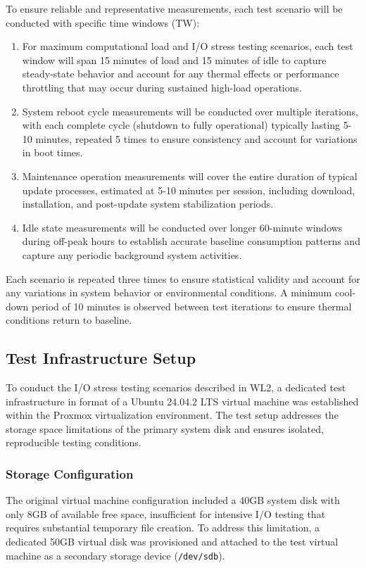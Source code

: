 To ensure reliable and representative measurements, each test scenario will be
conducted with specific time windows (TW):

\begin{enumerate}[label=TW\arabic*]
    \item For maximum computational load and I/O stress testing scenarios, each
    test window will span 15 minutes of load and 15 minutes of idle to capture steady-state 
    behavior and account for any thermal effects or performance throttling that may occur during
    sustained high-load operations.

    \item System reboot cycle measurements will be conducted over multiple
    iterations, with each complete cycle (shutdown to fully operational)
    typically lasting 5-10 minutes, repeated 5 times to ensure consistency and
    account for variations in boot times.

    \item Maintenance operation measurements will cover the entire duration of
    typical update processes, estimated at 5-10 minutes per session, including
    download, installation, and post-update system stabilization periods.

    \item Idle state measurements will be conducted over longer 60-minute windows
    during off-peak hours to establish accurate baseline consumption patterns and
    capture any periodic background system activities.
\end{enumerate}

Each scenario is repeated three times to ensure statistical validity and account for any variations in system behavior or environmental conditions. A minimum cool-down period of 10 minutes is observed between test iterations to ensure thermal conditions return to baseline.

\subsection{Test Infrastructure Setup}
\label{methodology:test-infrastructure-setup}
To conduct the I/O stress testing scenarios described in WL2, a dedicated test infrastructure in format
of a Ubuntu 24.04.2 LTS virtual machine was established within the Proxmox virtualization environment. 
The test setup addresses the storage space limitations of the primary system disk and ensures 
isolated, reproducible testing conditions.

\subsubsection{Storage Configuration}
\label{methodology:storage-configuration}
The original virtual machine configuration included a 40GB system disk with only 8GB of available
free space, insufficient for intensive I/O testing that requires substantial temporary file creation.
To address this limitation, a dedicated 50GB virtual disk was provisioned and attached to the test
virtual machine as a secondary storage device (\texttt{/dev/sdb}).


